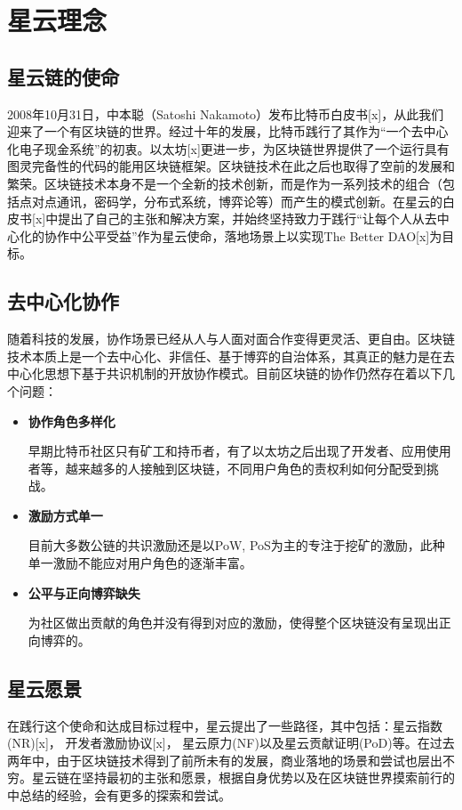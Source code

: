 \section{星云理念}

\subsection{星云链的使命}
2008年10⽉31⽇，中本聪（Satoshi Nakamoto）发布⽐特币⽩⽪书[x]，从此我们迎来了⼀个有区块链的世界。经过十年的发展，⽐特币践⾏了其作为“⼀个去中⼼化电⼦现⾦系统”的初衷。以太坊[x]更进一步，为区块链世界提供了一个运行具有图灵完备性的代码的能用区块链框架。区块链技术在此之后也取得了空前的发展和繁荣。区块链技术本身不是一个全新的技术创新，而是作为一系列技术的组合（包括点对点通讯，密码学，分布式系统，博弈论等）而产生的模式创新。在星云的白皮书[x]中提出了自己的主张和解决方案，并始终坚持致力于践行“让每个人从去中心化的协作中公平受益”作为星云使命，落地场景上以实现The Better DAO[x]为目标。


\subsection{去中心化协作}
随着科技的发展，协作场景已经从人与人面对面合作变得更灵活、更自由。区块链技术本质上是一个去中心化、非信任、基于博弈的自治体系，其真正的魅力是在去中心化思想下基于共识机制的开放协作模式。目前区块链的协作仍然存在着以下几个问题：

\begin{itemize}

	\item \textbf{协作角色多样化}

	早期比特币社区只有矿工和持币者，有了以太坊之后出现了开发者、应用使用者等，越来越多的人接触到区块链，不同用户角色的责权利如何分配受到挑战。

	\item \textbf{激励方式单一}

	目前大多数公链的共识激励还是以PoW, PoS为主的专注于挖矿的激励，此种单一激励不能应对用户角色的逐渐丰富。

	\item \textbf{公平与正向博弈缺失}

	为社区做出贡献的角色并没有得到对应的激励，使得整个区块链没有呈现出正向博弈的。

\end{itemize}

\subsection{星云愿景}
在践行这个使命和达成目标过程中，星云提出了一些路径，其中包括：星云指数(NR)[x]， 开发者激励协议[x]， 星云原力(NF)以及星云贡献证明(PoD)等。在过去两年中，由于区块链技术得到了前所未有的发展，商业落地的场景和尝试也层出不穷。星云链在坚持最初的主张和愿景，根据自身优势以及在区块链世界摸索前行的中总结的经验，会有更多的探索和尝试。
